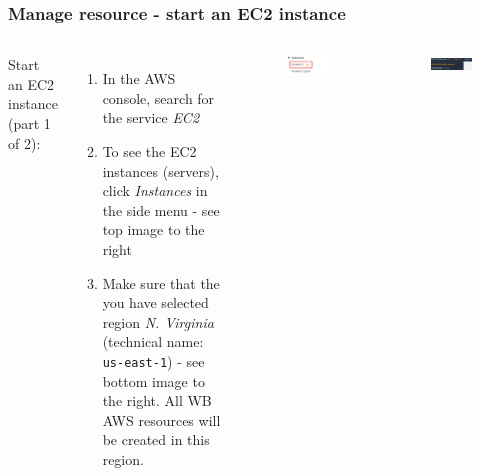 \documentclass[aspectratio=169]{beamer} %
\begin{document}
\begin{frame}
	\frametitle{Manage resource - start an EC2 instance}

	\begin{columns}[c]


			Start an EC2 instance (part 1 of 2):
	
			\begin{enumerate}
				\item In the AWS console, search for the service \textit{EC2} 
				\item To see the EC2 instances (servers), 
				click \textit{Instances} in the side menu - see top image to the right 
				\item Make sure that the you have selected region \textit{N. Virginia} (technical name: \texttt{us-east-1}) - see bottom image to the right. All WB AWS resources will be created in this region.
			\end{enumerate}


			\begin{figure}
				\centering
				\includegraphics[width=.7\textwidth]{./img/ec2-1.png}
			\end{figure}		
			
			\begin{figure}
				\centering
				\includegraphics[width=.8\textwidth]{./img/aws-console-1.png}
			\end{figure}
	\end{columns}
\end{frame}
\end{document}
